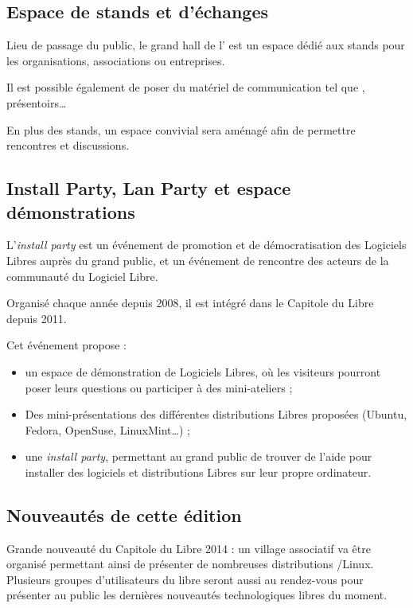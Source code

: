 \documentclass{cdl_sponsor}
\begin{document}
\subsection{Espace de stands et d'échanges}

Lieu de passage du public, le grand hall de l' est un espace dédié aux stands pour les organisations, associations ou entreprises.

\Separateur

Il est possible également de poser du matériel de communication tel que , présentoirs\dots

\Separateur

En plus des stands, un espace convivial sera aménagé afin de permettre rencontres et discussions.

\newpage
\subsection{Install Party, Lan Party et espace démonstrations}

L'\textit{install party} est un événement de promotion et de démocratisation des Logiciels Libres auprès du grand public, et un événement de rencontre des acteurs de la communauté du Logiciel Libre.

\Separateur

Organisé chaque année depuis 2008, il est intégré dans le Capitole du Libre depuis 2011.

\Separateur
 
Cet événement propose :
\begin{itemize}
\item[\logo] un espace de démonstration de Logiciels Libres, où les visiteurs pourront poser leurs questions ou participer à des mini-ateliers ;
\item[\logo] Des mini-présentations des différentes distributions Libres proposées (Ubuntu, Fedora, OpenSuse, LinuxMint\dots) ;
\item[\logo] une \textit{install party}, permettant au grand public de trouver de l'aide pour installer des logiciels et distributions Libres sur leur propre ordinateur.
\end{itemize}

\subsection{Nouveautés de cette édition}

Grande nouveauté du Capitole du Libre 2014 : un \textcolor{Cdl}{village associatif} va être organisé permettant ainsi de présenter de nombreuses distributions /Linux. Plusieurs groupes d'utilisateurs du libre seront aussi au rendez-vous pour présenter au public les dernières nouveautés technologiques libres du moment.
\end{document}
